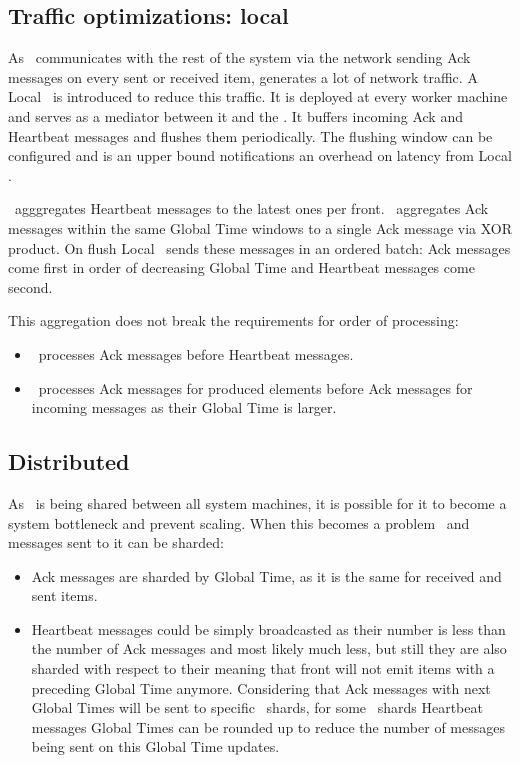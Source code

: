
\subsection{Traffic optimizations: local \tracker\ }

As \tracker\ communicates with the rest of the system via the network sending Ack messages on every sent or received item, generates a lot of network traffic. A Local \tracker\ is introduced to reduce this traffic. It is deployed at every worker machine and serves as a mediator between it and the \tracker. It buffers incoming Ack and Heartbeat messages and flushes them periodically. The flushing window can be configured and  is an upper bound notifications an overhead on latency from Local \tracker.

\tracker\ agggregates Heartbeat messages to the latest ones per front. \tracker\ aggregates Ack messages within the same Global Time windows to a single Ack message via XOR product. On flush Local \tracker\ sends these messages in an ordered batch: Ack messages come first in order of decreasing Global Time and Heartbeat messages come second.

This aggregation does not break the requirements for order of processing:
\begin{itemize}
	\item \tracker\ processes Ack messages before Heartbeat messages.
	\item \tracker\ processes Ack messages for produced elements before Ack messages for incoming messages as their Global Time is larger.
\end{itemize}

\subsection{Distributed \tracker\ }

As \tracker\ is being shared between all system machines, it is possible for it to become a system bottleneck and prevent scaling. When this becomes a problem \tracker\ and messages sent to it can be sharded:
\begin{itemize}
	\item Ack messages are sharded by Global Time, as it is the same for received and sent items.
	\item Heartbeat messages could be simply broadcasted as their number is less than the number of Ack messages and most likely much less, but still they are also sharded with respect to their meaning that front will not emit items with a preceding Global Time anymore. Considering that Ack messages with next Global Times will be sent to specific \tracker\ shards, for some \tracker\ shards Heartbeat messages Global Times can be rounded up to reduce the number of messages being sent on this Global Time updates.
\end{itemize}

